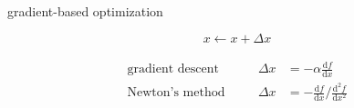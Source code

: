 \documentclass[aspectratio=169]{beamer}
\begin{document}








    

\begin{frame}{gradient-based optimization}

\begin{equation*}
    x \leftarrow x + \Delta x
\end{equation*}

\pause
\begin{align*}
    \begin{aligned}
        \text{gradient descent} & \quad & \Delta x &= -\alpha\frac{\text{d} f}{\text{d} x}\\
        \text{Newton's method} & & \Delta x &= -\frac{\text{d} f}{\text{d} x} \bigg/ \frac{\text{d}^2 f}{\text{d} x^2}
    \end{aligned}
\end{align*}

    
\end{frame}

\end{document}
